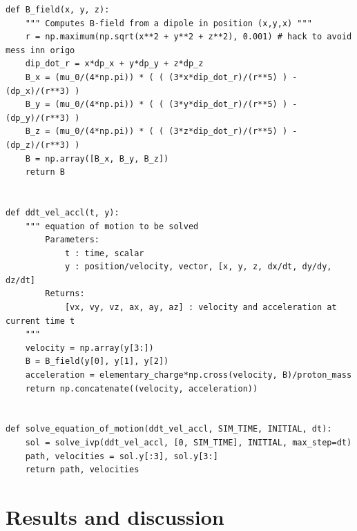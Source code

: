 \documentclass{article}
\begin{document}
\begin{lstlisting}[label=lst:functions]
def B_field(x, y, z): 
    """ Computes B-field from a dipole in position (x,y,x) """
    r = np.maximum(np.sqrt(x**2 + y**2 + z**2), 0.001) # hack to avoid mess inn origo
    dip_dot_r = x*dp_x + y*dp_y + z*dp_z
    B_x = (mu_0/(4*np.pi)) * ( ( (3*x*dip_dot_r)/(r**5) ) - (dp_x)/(r**3) )
    B_y = (mu_0/(4*np.pi)) * ( ( (3*y*dip_dot_r)/(r**5) ) - (dp_y)/(r**3) )
    B_z = (mu_0/(4*np.pi)) * ( ( (3*z*dip_dot_r)/(r**5) ) - (dp_z)/(r**3) )
    B = np.array([B_x, B_y, B_z])
    return B


def ddt_vel_accl(t, y): 
    """ equation of motion to be solved
        Parameters:
            t : time, scalar
            y : position/velocity, vector, [x, y, z, dx/dt, dy/dy, dz/dt]
        Returns:
            [vx, vy, vz, ax, ay, az] : velocity and acceleration at current time t
    """
    velocity = np.array(y[3:])
    B = B_field(y[0], y[1], y[2])
    acceleration = elementary_charge*np.cross(velocity, B)/proton_mass
    return np.concatenate((velocity, acceleration))


def solve_equation_of_motion(ddt_vel_accl, SIM_TIME, INITIAL, dt):
    sol = solve_ivp(ddt_vel_accl, [0, SIM_TIME], INITIAL, max_step=dt)
    path, velocities = sol.y[:3], sol.y[3:]
    return path, velocities
\end{lstlisting}

\section{Results and discussion}
\end{document}

